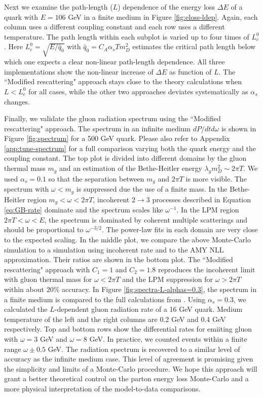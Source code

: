 \documentclass[aps, prc, reprint, amsmath, groupedaddress, nofootinbib]{revtex4-1}
\begin{document}
Next we examine the path-length ($L$) dependence of the energy loss $\Delta E$ of a quark with $E = 106$ GeV in a finite medium in Figure \ref{fig:eloss-ldep}.
Again, each column uses a different coupling constant and each row uses a different temperature. 
The path length within each subplot is varied up to four times of $L_c^0$.
Here $L_c^0 = \sqrt{E/\hat{q}_0}$ with $\hat{q}_0 = C_A \alpha_s T m_D^2$ estimates the critical path length below which one expects a clear non-linear path-length dependence.
All three implementations show the non-linear increase of $\Delta E$ as function of $L$.
The ``Modified rescattering" approach stays close to the theory calculations when $L<L_c^0$ for all cases, while the other two approaches deviates systematically as $\alpha_s$ changes.

Finally, we validate the gluon radiation spectrum using the ``Modified rescattering" approach. 
The spectrum in an infinite medium $dP/dtd\omega$ is shown in Figure \ref{fig:spectrum} for a 500 GeV quark.
Please also refer to Appendix \ref{app:tune-spectrum} for a full comparison varying both the quark energy and the coupling constant.
The top plot is divided into different domains by the gluon thermal mass $m_g$ and an estimation of the Bethe-Heitler energy $\lambda_g m_D^2 \sim 2\pi T$.
We used $\alpha_s = 0.1$ so that the separation between $m_g$ and $2\pi T$ is more visible.
The spectrum with $\omega < m_g$ is suppressed due the use of a finite mass.
In the Bethe-Heitler region $m_g < \omega < 2\pi T$, incoherent $2\rightarrow 3$ processes described in Equation \ref{eq:GB-rate} dominate and the spectrum scales like $\omega^{-1}$.
In the LPM region $2\pi T < \omega < E$, the spectrum is dominated by coherent multiple scatterings and should be proportional to $\omega^{-3/2}$.
The power-law fits in each domain are very close to the expected scaling.
In the middle plot, we compare the above Monte-Carlo simulation to a simulation using incoherent rate and to the AMY NLL approximation. 
Their ratios are shown in the bottom plot.
The ``Modified rescattering" approach with $C_1 = 1$ and $C_2 = 1.8$ reproduces the incoherent limit with gluon thermal mass for $\omega < 2\pi T$ and the LPM suppression for $\omega > 2\pi T$ within about 20\% accuracy.
In Figure \ref{fig:spectra-L-alphas=0.3}, the spectrum in a finite medium is compared to the full calculations from \cite{CaronHuot:2008uh}.
Using $\alpha_s = 0.3$, we calculated the $L$-dependent gluon radiation rate of a 16 GeV quark.
Medium temperature of the left and the right columns are 0.2 GeV and 0.4 GeV respectively.
Top and bottom rows show the differential rates for emiiting gluon with $\omega = 3$ GeV and $\omega = 8$ GeV. 
In practice, we counted events within a finite range $\omega\pm 0.5$ GeV.
The radiation spectrum is recovered to a similar level of accuracy as the infinite medium case.
This level of agreement is promising given the simplicity and limits of a Monte-Carlo procedure. 
We hope this approach will grant a better theoretical control on the parton energy loss Monte-Carlo and a more physical interpretation of the model-to-data comparisons.
\end{document}
